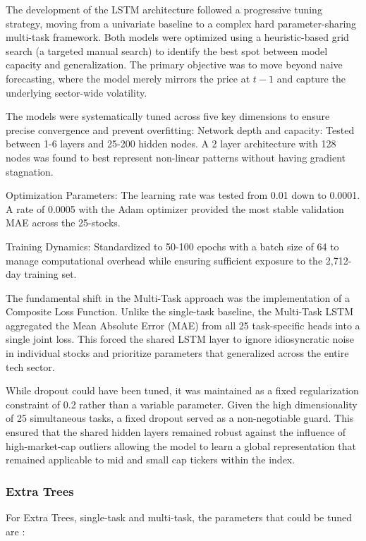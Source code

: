 \documentclass[conference]{IEEEtran}
\begin{document}
The development of the LSTM architecture followed a progressive tuning strategy, moving from a univariate baseline to a
complex hard parameter-sharing multi-task framework. Both models were optimized using a heuristic-based grid search (a
targeted manual search) to identify the best spot between model capacity and generalization. The primary objective was
to move beyond naive forecasting, where the model merely mirrors the price at $t-1$ and capture the underlying sector-wide
volatility.

The models were systematically tuned across five key dimensions to ensure precise convergence and prevent overfitting:
Network depth and capacity: Tested between 1-6 layers and 25-200 hidden nodes. A 2 layer architecture with 128 nodes was
found to best represent non-linear patterns without having gradient stagnation.

Optimization Parameters: The learning rate was tested from 0.01 down to 0.0001. A rate of 0.0005 with the Adam optimizer
provided the most stable validation MAE across the 25-stocks.

Training Dynamics: Standardized to 50-100 epochs with a batch size of 64 to manage computational overhead while ensuring
sufficient exposure to the 2,712-day training set. 

The fundamental shift in the Multi-Task approach was the implementation of a Composite Loss Function. Unlike the single-task
baseline, the Multi-Task LSTM aggregated the Mean Absolute Error (MAE) from all 25 task-specific heads into a single joint loss.
This forced the shared LSTM layer to ignore idiosyncratic noise in individual stocks and prioritize parameters that generalized
across the entire tech sector. 

While dropout could have been tuned, it was maintained as a fixed regularization constraint of 0.2 rather than a variable
parameter. Given the high dimensionality of 25 simultaneous tasks, a fixed dropout served as a non-negotiable guard. This
ensured that the shared hidden layers remained robust against the influence of high-market-cap outliers allowing the model
to learn a global representation that remained applicable to mid and small cap tickers within the index. 

\subsubsection*{Extra Trees}
For Extra Trees, single-task and multi-task, the parameters that could be tuned  are \cite{rfmulti}:
\end{document}
